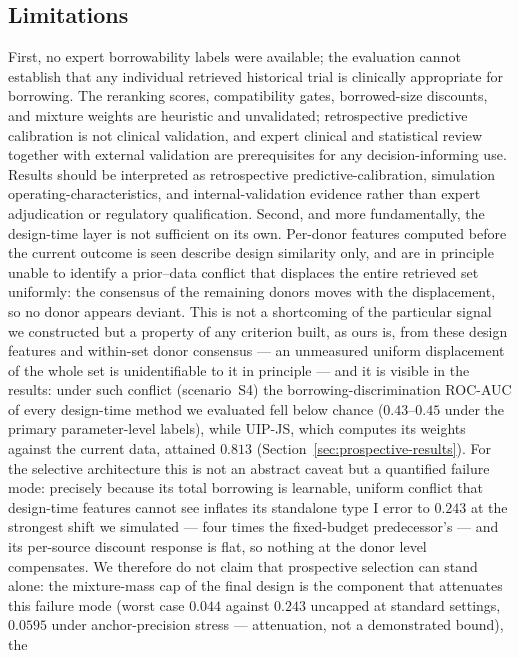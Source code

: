 \documentclass[11pt]{article}
\begin{document}
\subsection{Limitations}
First, no expert borrowability labels were available; the evaluation cannot
establish that any individual retrieved historical trial is clinically
appropriate for borrowing. The reranking scores, compatibility gates,
borrowed-size discounts, and mixture weights are heuristic and unvalidated;
retrospective predictive calibration is not clinical validation, and expert
clinical and statistical review together with external validation are
prerequisites for any decision-informing use. Results should be interpreted as
retrospective predictive-calibration, simulation operating-characteristics,
and internal-validation evidence rather than expert adjudication or regulatory
qualification. Second, and more fundamentally, the design-time layer is not
sufficient on its own. Per-donor features computed before the current outcome is
seen describe design similarity only, and are in principle unable to identify a
prior--data conflict that displaces the entire retrieved set uniformly: the
consensus of the remaining donors moves with the displacement, so no donor
appears deviant. This is not a shortcoming of the particular signal we
constructed but a property of any criterion built, as ours is, from these
design features and within-set donor consensus --- an unmeasured uniform
displacement of the whole set is unidentifiable to it in principle --- and it
is visible in
the results: under such conflict (scenario~S4) the borrowing-discrimination
ROC-AUC of every design-time method we evaluated fell below chance
($0.43$--$0.45$ under the primary parameter-level labels), while UIP-JS,
which computes its weights against the current data, attained $0.813$
(Section~\ref{sec:prospective-results}). For the selective architecture this
is not an abstract caveat but a quantified failure mode: precisely because
its total borrowing is learnable, uniform conflict that design-time features
cannot see inflates its standalone type I error to $0.243$ at the strongest
shift we simulated --- four times the fixed-budget predecessor's --- and its
per-source discount response is flat, so nothing at the donor level
compensates. We therefore do not claim that
prospective selection can stand alone: the mixture-mass cap of the final
design is the component that attenuates this failure mode (worst case
$0.044$
against $0.243$ uncapped at standard settings, $0.0595$ under
anchor-precision stress --- attenuation, not a demonstrated bound), the
\end{document}
